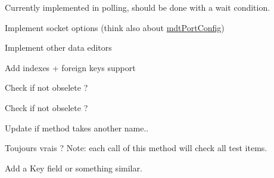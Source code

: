 \begin{DoxyRefList}
\item[\label{todo__todo000035}%
\hypertarget{todo__todo000035}{}%
Member \hyperlink{classmdt_port_thread_helper_aed853f4cedc143c62e7dad5e38ff4b8c}{mdt\-Port\-Thread\-Helper\-:\-:get\-New\-Frame\-Read} ()]Currently implemented in polling, should be done with a wait condition. 
\item[\label{todo__todo000036}%
\hypertarget{todo__todo000036}{}%
Member \hyperlink{classmdt_port_thread_helper_socket_aa77afb8d26e4863bd437e0d59efae7a7}{mdt\-Port\-Thread\-Helper\-Socket\-:\-:mdt\-Port\-Thread\-Helper\-Socket} (\hyperlink{class_q_object}{Q\-Object} $\ast$parent=0)]Implement socket options (think also about \hyperlink{classmdt_port_config}{mdt\-Port\-Config})  
\item[\label{todo__todo000006}%
\hypertarget{todo__todo000006}{}%
Class \hyperlink{classmdt_sql_field_handler_label}{mdt\-Sql\-Field\-Handler\-Label} ]Implement other data editors  
\item[\label{todo__todo000007}%
\hypertarget{todo__todo000007}{}%
Member \hyperlink{classmdt_sql_schema_table_a2cea444ccb26b0802fb230db5460e167}{mdt\-Sql\-Schema\-Table\-:\-:setup\-From\-Table} (const Q\-String \&name, Q\-Sql\-Database db)]Add indexes + foreign keys support  
\item[\label{todo__todo000092}%
\hypertarget{todo__todo000092}{}%
Class \hyperlink{classmdt_sql_table_model}{mdt\-Sql\-Table\-Model} ]Check if not obselete ?  
\item[\label{todo__todo000091}%
\hypertarget{todo__todo000091}{}%
Member \hyperlink{classmdt_sql_table_model_ad423c1b0c74ecbbb575637b028c2574b}{mdt\-Sql\-Table\-Model\-:\-:mdt\-Sql\-Table\-Model} (\hyperlink{class_q_object}{Q\-Object} $\ast$parent=0, Q\-Sql\-Database db=Q\-Sql\-Database())]Check if not obselete ?  
\item[\label{todo__todo000058}%
\hypertarget{todo__todo000058}{}%
Member \hyperlink{classmdt_tt_abstract_tester_a9cc3f5bfe9e27ac0ae376ea1c82e8585}{mdt\-Tt\-Abstract\-Tester\-:\-:set\-Test\-Ui\-Widget} (\hyperlink{class_q_widget}{Q\-Widget} $\ast$widget)]Update if method takes another name.. 
\item[\label{todo__todo000059}%
\hypertarget{todo__todo000059}{}%
Member \hyperlink{classmdt_tt_abstract_tester_af98bb9d80bfbd14873fc356c17d31eb4}{mdt\-Tt\-Abstract\-Tester\-:\-:test\-Is\-Saved} () const ]Toujours vrais ? Note\-: each call of this method will check all test items.  
\item[\label{todo__todo000060}%
\hypertarget{todo__todo000060}{}%
Member \hyperlink{classmdt_tt_abstract_test_node_calibration_tool_a85c47fe2b501769f5966a27aeb3f051a}{mdt\-Tt\-Abstract\-Test\-Node\-Calibration\-Tool\-:\-:set\-Test\-Node} (const Q\-Variant \&test\-Node\-Id)]Add a Key field or something similar.  

\end{DoxyRefList}

